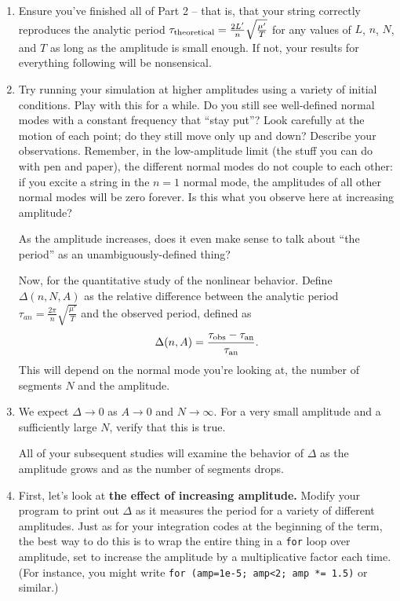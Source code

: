 \documentclass[12pt]{article}
\begin{document}
\begin{enumerate}

\item Ensure you've finished all of Part 2 -- that is, that your string correctly reproduces the analytic period $\tau_{\rm theoretical} = \frac{2L'}{n} \sqrt{\frac{\mu'}{T}}$ for any values of $L$, $n$, $N$, and $T$ as long as the amplitude is small enough. If not, your results for everything following will be nonsensical.

\item Try running your simulation at higher amplitudes using a variety of initial conditions. Play with this for a while. 
Do you still see well-defined normal modes with a constant frequency that ``stay put''? Look carefully at the motion of each point; do they still move only up and down? Describe your observations.
Remember, in the low-amplitude limit (the stuff you can do with pen and paper), the different normal modes do not couple to each other: if you excite a string in the $n=1$ normal mode, 
the amplitudes of all other normal modes will be zero forever. Is this what you observe here at increasing amplitude? 

As the amplitude increases, does it even make sense to talk about ``the period'' as an unambiguously-defined thing?

Now, for the quantitative study of the nonlinear behavior. Define $\Delta(n,N,A)$ as the relative difference between the analytic period $\tau_{an} = \frac{2\pi}{n}\sqrt{\frac{\mu'}{T}}$ and the observed period, defined as $$\Delta(n,A) = \frac{\tau_{\rm {obs}}-\tau_{\rm{an}}}{\tau_{\rm{an}}}.$$ This will depend on the normal mode you're looking at, the number of segments $N$ and the amplitude. 

\item We expect $\Delta \rightarrow 0$ as $A \rightarrow 0$ and $N \rightarrow \infty$. For a very small amplitude and a sufficiently large $N$, verify that this is true.

All of your subsequent studies will examine the behavior of $\Delta$ as the amplitude grows and as the number of segments drops.



\item First, let's look at {\bf the effect of increasing amplitude.} Modify your program to print out $\Delta$ as it measures the period for a variety of different amplitudes. Just as for your integration codes at the beginning of the term, the best
way to do this is to wrap the entire thing in a {\tt for} loop over amplitude, set to increase the amplitude by a multiplicative factor each time. (For instance, you might write
{\tt for (amp=1e-5; amp<2; amp *= 1.5)} or similar.) 


\end{enumerate}
\end{document}
